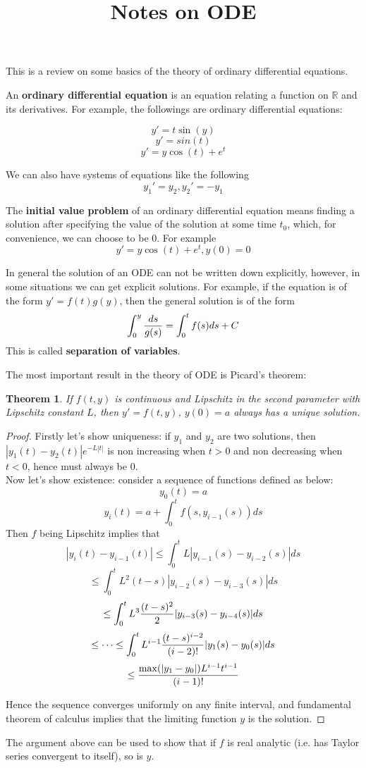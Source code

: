 \documentclass[20pt]{article} %
\title{Notes on ODE}
\theoremstyle{break}
\newtheorem{thm}[definition]{Theorem}
\begin{document}
\maketitle

This is a review on some basics of the theory of ordinary differential equations.

An {\bf ordinary differential equation} is an equation relating a function on $\mathbb{R}$ and its derivatives. For example, the followings are ordinary differential equations:

\[y'=t\sin(y)\]
\[y'=sin(t)\]
\[y'=y\cos(t)+e^t\]

We can also have systems of equations like the following
\[y_1'=y_2, y_2'=-y_1\]


The {\bf initial value problem} of an ordinary differential equation means finding a solution after specifying the value of the solution at some time $t_0$, which, for convenience, we can choose to be $0$. For example
\[y'=y\cos(t)+e^t, y(0)=0\]

In general the solution of an ODE can not be written down explicitly, however, in some situations we can get explicit solutions. For example, if the equation is of the form $y'=f(t)g(y)$, then the general solution is of the form
\[\int_0^y {ds\over g(s)}=\int_0^t f(s)ds+C\]
This is called {\bf separation of variables}.

The most important result in the theory of ODE is Picard's theorem:

\begin{thm}
If $f(t, y)$ is continuous and Lipschitz in the second parameter with Lipschitz constant $L$, then $y'=f(t, y)$, $y(0)=a$ always has a unique solution.
\end{thm}

\begin{proof}
 Firstly let's show uniqueness: if $y_1$ and $y_2$ are two solutions, then $|y_1(t)-y_2(t)|e^{-L|t|}$ is non increasing when $t>0$ and non decreasing when $t<0$, hence must always be $0$.\\
  
  Now let's show existence: consider a sequence of functions defined as below:
  \[y_0(t)=a\]
  \[y_i(t)=a+\int_0^t f(s, y_{i-1}(s))ds\]
  Then $f$ being Lipschitz implies that
  \[|y_i(t)-y_{i-1}(t)|\leq \int_0^t L|y_{i-1}(s)-y_{i-2}(s)|ds\]
  \[\leq \int_0^t L^2(t-s)|y_{i-2}(s)-y_{i-3}(s)|ds\]
  \[\leq \int_0^t L^3{(t-s)^2\over 2}|y_{i-3}(s)-y_{i-4}(s)|ds\]
  \[\leq \dots \leq \int_0^t L^{i-1}{(t-s)^{i-2}\over (i-2)!}|y_1(s)-y_0(s)|ds\]
  \[\leq {\max(|y_1-y_0|)L^{i-1}t^{i-1}\over (i-1)!}\]

  Hence the sequence converges uniformly on any finite interval, and fundamental theorem of calculus implies that the limiting function $y$ is the solution.
\end{proof}

The argument above can be used to show that if $f$ is real analytic (i.e. has Taylor series convergent to itself), so is $y$.
\end{document}
